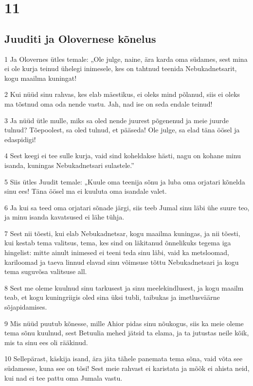 \chapter{11}

\section*{Juuditi ja Olovernese kõnelus}

\par 1 Ja Olovernes ütles temale: „Ole julge, naine, ära karda oma südames, sest mina ei ole kurja teinud ühelegi inimesele, kes on tahtnud teenida Nebukadnetsarit, kogu maailma kuningat!
\par 2 Kui nüüd sinu rahvas, kes elab mäestikus, ei oleks mind põlanud, siis ei oleks ma tõstnud oma oda nende vastu. Jah, nad ise on seda endale teinud!
\par 3 Ja nüüd ütle mulle, miks sa oled nende juurest põgenenud ja meie juurde tulnud? Tõepoolest, sa oled tulnud, et pääseda! Ole julge, sa elad täna öösel ja edaspidigi!
\par 4 Sest keegi ei tee sulle kurja, vaid sind koheldakse hästi, nagu on kohane minu isanda, kuningas Nebukadnetsari sulastele.”
\par 5 Siis ütles Juudit temale: „Kuule oma teenija sõnu ja luba oma orjatari kõnelda sinu ees! Täna öösel ma ei kuuluta oma isandale valet.
\par 6 Ja kui sa teed oma orjatari sõnade järgi, siis teeb Jumal sinu läbi ühe suure teo, ja minu isanda kavatsused ei lähe tühja.
\par 7 Sest nii tõesti, kui elab Nebukadnetsar, kogu maailma kuningas, ja nii tõesti, kui kestab tema valitsus, tema, kes sind on läkitanud õnnelikuks tegema iga hingelist: mitte ainult inimesed ei teeni teda sinu läbi, vaid ka metsloomad, kariloomad ja taeva linnud elavad sinu võimsuse tõttu Nebukadnetsari ja kogu tema suguvõsa valitsuse all.
\par 8 Sest me oleme kuulnud sinu tarkusest ja sinu meelekindlusest, ja kogu maailm teab, et kogu kuningriigis oled sina üksi tubli, taibukas ja imetlusväärne sõjapidamises.
\par 9 Mis nüüd puutub kõnesse, mille Ahior pidas sinu nõukogus, siis ka meie oleme tema sõnu kuulnud, sest Betuulia mehed jätsid ta elama, ja ta jutustas neile kõik, mis ta sinu ees oli rääkinud.
\par 10 Sellepärast, käskija isand, ära jäta tähele panemata tema sõna, vaid võta see südamesse, kuna see on tõsi! Sest meie rahvast ei karistata ja mõõk ei ahista neid, kui nad ei tee pattu oma Jumala vastu.
